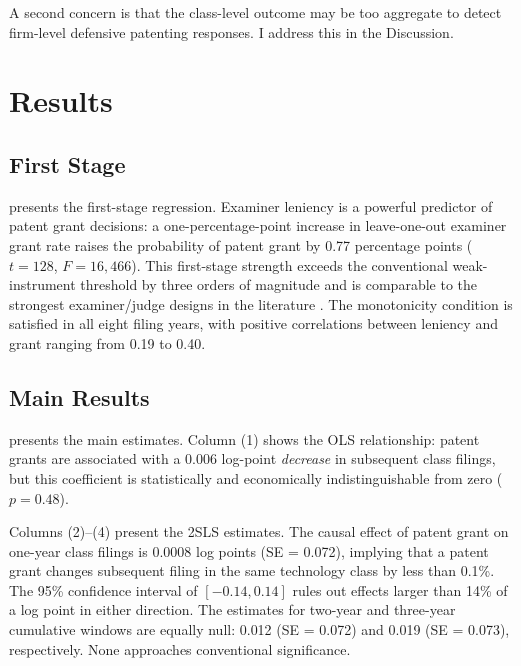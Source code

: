 \documentclass[12pt]{article}
\begin{document}
A second concern is that the class-level outcome may be too aggregate to detect firm-level defensive patenting responses. I address this in the Discussion.


\section{Results}

\subsection{First Stage}



 presents the first-stage regression. Examiner leniency is a powerful predictor of patent grant decisions: a one-percentage-point increase in leave-one-out examiner grant rate raises the probability of patent grant by 0.77 percentage points ($t = 128$, $F = 16{,}466$). This first-stage strength exceeds the conventional weak-instrument threshold by three orders of magnitude and is comparable to the strongest examiner/judge designs in the literature \citep{chyn2024}. The monotonicity condition is satisfied in all eight filing years, with positive correlations between leniency and grant ranging from 0.19 to 0.40.

\subsection{Main Results}



 presents the main estimates. Column (1) shows the OLS relationship: patent grants are associated with a 0.006 log-point \emph{decrease} in subsequent class filings, but this coefficient is statistically and economically indistinguishable from zero ($p = 0.48$).

Columns (2)--(4) present the 2SLS estimates. The causal effect of patent grant on one-year class filings is 0.0008 log points (SE = 0.072), implying that a patent grant changes subsequent filing in the same technology class by less than 0.1\%. The 95\% confidence interval of $[-0.14, 0.14]$ rules out effects larger than 14\% of a log point in either direction. The estimates for two-year and three-year cumulative windows are equally null: 0.012 (SE = 0.072) and 0.019 (SE = 0.073), respectively. None approaches conventional significance.
\end{document}
